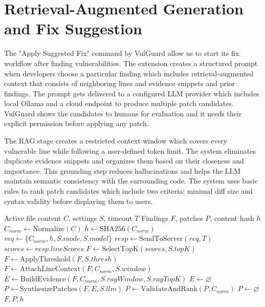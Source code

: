 \section{Retrieval-Augmented Generation and Fix Suggestion}
The "Apply Suggested Fix" command by VulGuard allow us to start its fix workflow after finding vulnerabilities. The extension creates a structured prompt when developers choose a particular finding which includes retrieval-augmented context that consists of neighboring lines and evidence snippets and prior findings. The prompt gets delivered to a configured LLM provider which includes local Ollama and a cloud endpoint to produce multiple patch candidates. VulGuard shows the candidates to humans for evaluation and it needs their explicit permission before applying any patch.

The RAG stage creates a restricted context window which covers every vulnerable line while following a user-defined token limit. The system eliminates duplicate evidence snippets and organizes them based on their closeness and importance. This grounding step reduces hallucinations and helps the LLM maintain semantic consistency with the surrounding code. The system uses basic rules to rank patch candidates which include two criteria: minimal diff size and syntax validity before displaying them to users.

\begin{algorithm}[htbp]
\caption{End-to-End VulGuard Analysis Pipeline}
\begin{algorithmic}[1]
\Require Active file content $C$, settings $S$, timeout $T$
\Ensure Findings $F$, patches $P$, content hash $h$
\State $C_{norm} \leftarrow \text{Normalize}(C)$
\State $h \leftarrow \text{SHA256}(C_{norm})$
\State $req \leftarrow \{C_{norm}, h, S.mode, S.model\}$
\State $resp \leftarrow \text{SendToServer}(req, T)$
\State $scores \leftarrow resp.lineScores$
\State $F \leftarrow \text{SelectTopK}(scores, S.topK)$
\State $F \leftarrow \text{ApplyThreshold}(F, S.thresh)$
\State $F \leftarrow \text{AttachLineContext}(F, C_{norm}, S.window)$
    \State $E \leftarrow \text{BuildEvidence}(F, C_{norm}, S.ragWindow, S.ragTopK)$
\Else
    \State $E \leftarrow \varnothing$
\EndIf
{}
    \State $P \leftarrow \text{SynthesizePatches}(F, E, S.llm)$
    \State $P \leftarrow \text{ValidateAndRank}(P, C_{norm})$
\Else
    \State $P \leftarrow \varnothing$
\EndIf
\State \Return $F, P, h$
\end{algorithmic}
\end{algorithm}

